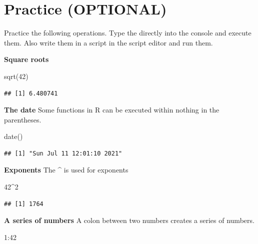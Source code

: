 \documentclass[
]{book}
\newenvironment{Shaded}{\begin{snugshade}}{\end{snugshade}}
\newcommand{\DecValTok}[1]{\textcolor[rgb]{0.00,0.00,0.81}{#1}}
\newcommand{\FunctionTok}[1]{\textcolor[rgb]{0.00,0.00,0.00}{#1}}
\newcommand{\NormalTok}[1]{#1}
\newcommand{\SpecialCharTok}[1]{\textcolor[rgb]{0.00,0.00,0.00}{#1}}
\begin{document}
\hypertarget{practice-optional}{%
\section{Practice (OPTIONAL)}\label{practice-optional}}

Practice the following operations. Type the directly into the console and execute them. Also write them in a script in the script editor and run them.

\textbf{Square roots}

\begin{Shaded}
\begin{Highlighting}[]
\FunctionTok{sqrt}\NormalTok{(}\DecValTok{42}\NormalTok{)}
\end{Highlighting}
\end{Shaded}

\begin{verbatim}
## [1] 6.480741
\end{verbatim}

\textbf{The date}
Some functions in R can be executed within nothing in the parentheses.

\begin{Shaded}
\begin{Highlighting}[]
\FunctionTok{date}\NormalTok{()}
\end{Highlighting}
\end{Shaded}

\begin{verbatim}
## [1] "Sun Jul 11 12:01:10 2021"
\end{verbatim}

\textbf{Exponents}
The \textbf{\^{}} is used for exponents

\begin{Shaded}
\begin{Highlighting}[]
\DecValTok{42}\SpecialCharTok{\^{}}\DecValTok{2}
\end{Highlighting}
\end{Shaded}

\begin{verbatim}
## [1] 1764
\end{verbatim}

\textbf{A series of numbers}
A colon between two numbers creates a series of numbers.

\begin{Shaded}
\begin{Highlighting}[]
\DecValTok{1}\SpecialCharTok{:}\DecValTok{42}
\end{Highlighting}
\end{Shaded}
\end{document}
